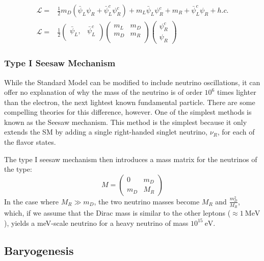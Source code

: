 \documentclass[12pt,a4paper]{article}
\begin{document}
\begin{align}
\mathcal{L} = & \frac{1}{2}m_D(\bar{\psi}_L\psi_R+\bar{\psi}^c_L\psi^c_R)+m_L\bar{\psi}_L\psi^c_R+m_R+\bar{\psi}^c_L\psi_R +h.c. \\
\mathcal{L} = &\frac{1}{2} \begin{pmatrix}
\bar{\psi}_L,& \bar{\psi}^c_L \\
\end{pmatrix} \begin{pmatrix}
m_L & m_D \\
m_D & m_R \\
\end{pmatrix}
\begin{pmatrix}
\psi^c_R \\
\psi_R
\end{pmatrix}
\end{align}

\subsubsection*{Type I Seesaw Mechanism}

While the Standard Model can be modified to include neutrino oscillations, it can offer no explanation of why the mass of the neutrino is of order $10^6$ times lighter than the electron, the next lightest known fundamental particle. There are some compelling theories for this difference, however. One of the simplest methods is known as the Seesaw mechanism. This method is the simplest because it only extends the SM by adding a single right-handed singlet neutrino, $\nu_R$, for each of the flavor states.

The type I seesaw mechanism then introduces a mass matrix for the neutrinos of the type:
\begin{equation}
M =\begin{pmatrix}
0 & m_D \\
m_D & M_R
\end{pmatrix}
\end{equation}
In the case where $M_R \gg m_D$, the two neutrino masses become $M_R$ and $\frac{m_D^2}{M_R}$, which, if we assume that the Dirac mass is similar to the other leptons ($\approx 1~\textrm{MeV}$), yields a meV-scale neutrino for a heavy neutrino of mass $10^{15}~ \textrm{eV}$.

\subsection{Baryogenesis}
\end{document}
